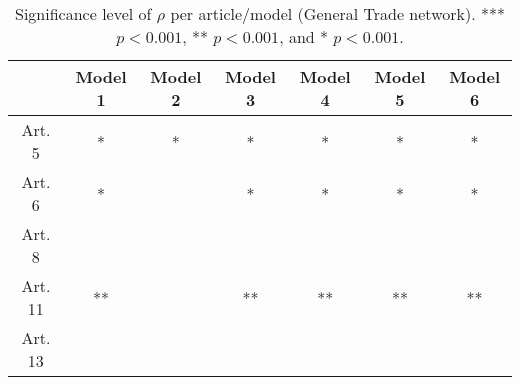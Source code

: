 \begin{table}[ht]
\centering
\begin{tabular}{ccccccc}
  \toprule
 & Model 1 & Model 2 & Model 3 & Model 4 & Model 5 & Model 6 \\ 
  \midrule
Art. 5 & * & * & * & * & * & * \\ 
   \midrule
Art. 6 & * &   & * & * & * & * \\ 
   \midrule
Art. 8 &   &   &   &   &   &   \\ 
   \midrule
Art. 11 & ** &   & ** & ** & ** & ** \\ 
   \midrule
Art. 13 &   &   &   &   &   &   \\ 
   \bottomrule
\end{tabular}
\caption{Significance level of $\rho$ per article/model (General Trade network). *** $p < 0.001$, ** $p < 0.001$, and * $p < 0.001$.} 
\end{table}

